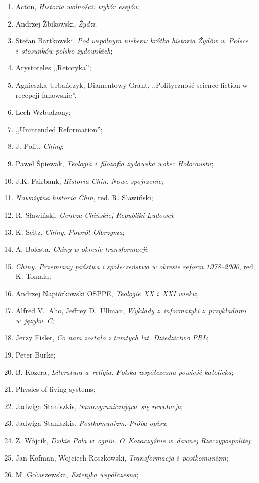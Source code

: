 \documentclass[a4paper,11pt]{article}
\begin{document}
\begin{enumerate}
\item Acton, \emph{Historia wolności: wybór esejów};
\item Andrzej Żbikowski, \emph{Żydzi};
\item Stefan Bartkowski, \emph{Pod wspólnym niebem: krótka historia
    Żydów w~Polsce i~stosunków polsko-żydowskich};
\item Arystoteles ,,Retoryka'';
\item Agnieszka Urbańczyk, Diamentowy Grant, ,,Polityczność science
  fiction w recepcji fanowskie''.
\item Lech Wzbudzony;
\item ,,Unintended Reformation'';
\item J. Polit, \emph{Chiny};
\item Paweł Śpiewak, \emph{Teologia i~filozofia żydowska wobec
    Holocaustu};
\item J.K. Fairbank, \emph{Historia Chin. Nowe spojrzenie};
\item \emph{Nowożytna historia Chin}, red. R. Sławiński;
\item R. Sławiński, \emph{Geneza Chińskiej Republiki Ludowej};
\item K. Seitz, \emph{Chiny. Powrót Olbrzyma};
\item A. Bolesta, \emph{Chiny w okresie transformacji};
\item \emph{Chiny. Przemiany państwa i społeczeństwa w okresie reform
    1978--2000}, red. K. Tomala;
\item Andrzej Napiórkowski OSPPE, \emph{Teologie XX i~XXI wieku};
\item Alfred V.~Aho, Jeffrey D.~Ullman, \emph{Wykłady z~informatyki
    z~przykładami w~języku~C};
\item Jerzy Eisler, \emph{Co nam zostało z tamtych lat. Dziedzictwo
    PRL};
\item Peter Burke;
\item B. Kozera, \emph{Literatura a~religia. Polska współczesna
    powieść katolicka};
\item Physics of living systems;
\item Jadwiga Staniszkis, \emph{Samoograniczająca~się rewolucja};
\item Jadwiga Staniszkis, \emph{Postkomunizm. Próba opisu};
\item Z. Wójcik, \emph{Dzikie Pola w~ogniu. O~Kozaczyźnie w~dawnej
    Rzeczypospolitej};
\item Jan Kofman, Wojciech Roszkowski, \emph{Transformacja
    i~postkomunizm};
\item M. Gołaszewska, \emph{Estetyka współczesna};

\end{enumerate}
\end{document}
